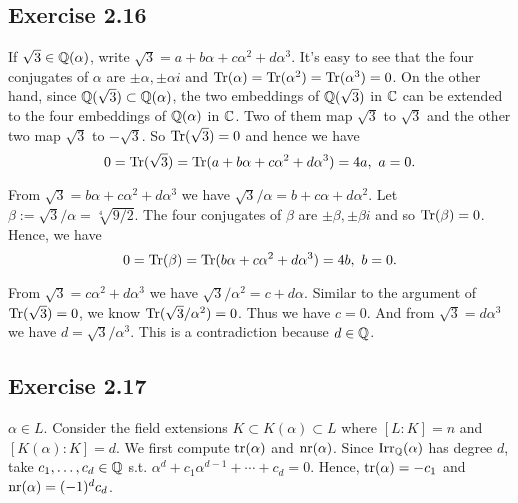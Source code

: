 \documentclass[../Marcus.tex]{subfiles}
\begin{document}
\subsection*{Exercise 2.16}

If $\sqrt{3}\in\mathbb{Q}(\alpha)$, write $\sqrt{3}=a+b\alpha+c\alpha^2+d\alpha^3$. It's easy to see that the four conjugates of $\alpha$ are $\pm\alpha,\pm\alpha i$ and $\operatorname{Tr}(\alpha)=\operatorname{Tr}(\alpha^2)=\operatorname{Tr}(\alpha^3)=0$. On the other hand, since $\mathbb{Q}(\sqrt{3})\subset\mathbb{Q}(\alpha)$, the two embeddings of $\mathbb{Q}(\sqrt{3})$ in $\mathbb{C}$ can be extended to the four embeddings of $\mathbb{Q}(\alpha)$ in $\mathbb{C}$. Two of them map $\sqrt{3}$ to $\sqrt{3}$ and the other two map $\sqrt{3}$ to $-\sqrt{3}$. So $\operatorname{Tr}(\sqrt{3})=0$ and hence we have 
$$
0=\operatorname{Tr}(\sqrt{3})=\operatorname{Tr}(a+b\alpha+c\alpha^2+d\alpha^3)=4a, \ a=0.
$$

From $\sqrt{3}=b\alpha+c\alpha^2+d\alpha^3$ we have $\sqrt{3}/\alpha=b+c\alpha+d\alpha^2$. Let $\beta:=\sqrt{3}/\alpha=\sqrt[4]{9/2}$. The four conjugates of $\beta$ are $\pm\beta,\pm\beta i$ and so $\operatorname{Tr}(\beta)=0$. Hence, we have 
$$
0=\operatorname{Tr}(\beta)=\operatorname{Tr}(b\alpha+c\alpha^2+d\alpha^3)=4b, \ b=0.
$$

From  $\sqrt{3}=c\alpha^2+d\alpha^3$ we have $\sqrt{3}/\alpha^2=c+d\alpha$. Similar to the argument of $\operatorname{Tr}(\sqrt{3})=0$, we know $\operatorname{Tr}(\sqrt{3}/\alpha^2)=0$. Thus we have $c=0$. And from $\sqrt{3}=d\alpha^3$ we have $d=\sqrt{3}/\alpha^3$. This is a contradiction because $d\in\mathbb{Q}$.

\subsection*{Exercise 2.17}

$\alpha\in L$. Consider the field extensions $K\subset K(\alpha)\subset L$ where $[L:K]=n$ and $[K(\alpha):K]=d$. We first compute $\operatorname{tr}(\alpha)$ and $\operatorname{nr}(\alpha)$. Since $\operatorname{Irr}_{\mathbb{Q}}(\alpha)$ has degree $d$, take $c_1,\ldots,c_d\in\mathbb{Q}$ s.t. $\alpha^d+c_1\alpha^{d-1}+\cdots+c_d=0$. Hence, $\operatorname{tr}(\alpha)=-c_1$ and $\operatorname{nr}(\alpha)=(-1)^{d}c_d$.
\end{document}
